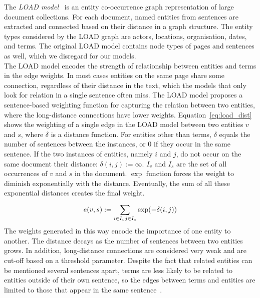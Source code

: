 The \emph{LOAD model}~ is an entity co-occurrence graph representation of large document collections. For each document, named entities from sentences are extracted and connected based on their distance in a graph structure. The entity types considered by the LOAD graph are actors, locations, organisation, dates, and terms. The original LOAD model contains node types of pages and sentences as well, which we disregard for our models.\\
The LOAD model encodes the strength of relationship between entities and terms in the edge weights. In most cases entities on the same page share some connection, regardless of their distance in the text, which the models that only look for relation in a single sentence often miss. The LOAD model proposes a sentence-based weighting function for capturing the relation between two entities, where the long-distance connections have lower weights. Equation~\ref{eq:load_dist} shows the weighting of a single edge in the LOAD model between two entities $v$ and $s$, where $\delta $ is a distance function. For entities other than terms, $\delta $ equals the number of sentences between the instances, or $0$ if they occur in the same sentence.
If the two instances of entities, namely $i$ and $ j$, do not occur on the same document their distance: $ \delta(i, j) := \infty$. $ I_{ v }$ and $I_{ s } $ are the set of all occurrences of $v$ and $s$ in the document. $\exp$ function forces the weight to diminish exponentially with the distance. Eventually, the sum of all these exponential distances creates the final weight.
\begin{equation}
e (v,s) :=\sum _{ i\in I_{ v } \\ j\in I_{ s } }^{  }{ \exp } (-\delta (i,j))
\label{eq:load_dist}
\end{equation}
The weights generated in this way encode the importance of one entity to another. The distance decays as the number of sentences between two entities grows. In addition, long-distance connections are considered very weak and are cut-off based on a threshold parameter. 
Despite the fact that related entities can be mentioned several sentences apart, terms are less likely to be related to entities outside of their own sentence, so the edges between terms and entities are limited to those that appear in the same sentence~. 
